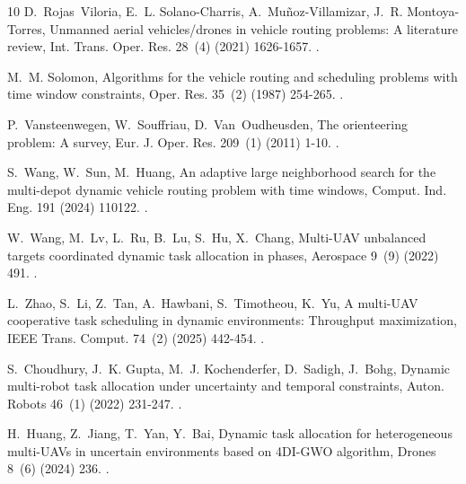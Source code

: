 \documentclass[a4paper,fleqn]{cas-dc}
\begin{document}
\begin{thebibliography}{10}
D.~Rojas~Viloria, E.~L. Solano-Charris, A.~Mu{\~n}oz-Villamizar, J.~R.
  Montoya-Torres, Unmanned aerial vehicles/drones in vehicle routing problems:
  A literature review, Int. Trans. Oper. Res. 28~(4) (2021) 1626-1657.
\newblock \href {https://doi.org/10.1111/itor.12783}
  {}.

M.~M. Solomon, Algorithms for the vehicle routing and scheduling problems with
  time window constraints, Oper. Res. 35~(2) (1987) 254-265.
\newblock \href {https://doi.org/10.1287/opre.35.2.254}
  {}.

P.~Vansteenwegen, W.~Souffriau, D.~Van~Oudheusden, The orienteering problem: A
  survey, Eur. J. Oper. Res. 209~(1) (2011) 1-10.
\newblock \href {https://doi.org/10.1016/j.ejor.2010.03.045}
  {}.

S.~Wang, W.~Sun, M.~Huang, An adaptive large neighborhood search for the
  multi-depot dynamic vehicle routing problem with time windows, Comput. Ind.
  Eng. 191 (2024) 110122.
\newblock \href {https://doi.org/10.1016/j.cie.2024.110122}
  {}.

W.~Wang, M.~Lv, L.~Ru, B.~Lu, S.~Hu, X.~Chang, Multi-{UAV} unbalanced targets
  coordinated dynamic task allocation in phases, Aerospace 9~(9) (2022) 491.
\newblock \href {https://doi.org/10.3390/aerospace9090491}
  {}.

L.~Zhao, S.~Li, Z.~Tan, A.~Hawbani, S.~Timotheou, K.~Yu, A multi-{UAV}
  cooperative task scheduling in dynamic environments: Throughput maximization,
  IEEE Trans. Comput. 74~(2) (2025) 442-454.
\newblock \href {https://doi.org/10.1109/TC.2024.3483636}
  {}.

S.~Choudhury, J.~K. Gupta, M.~J. Kochenderfer, D.~Sadigh, J.~Bohg, Dynamic
  multi-robot task allocation under uncertainty and temporal constraints,
  Auton. Robots 46~(1) (2022) 231-247.
\newblock \href {https://doi.org/10.1007/s10514-021-10022-9}
  {}.

H.~Huang, Z.~Jiang, T.~Yan, Y.~Bai, Dynamic task allocation for heterogeneous
  multi-{UAVs} in uncertain environments based on {4DI-GWO} algorithm, Drones
  8~(6) (2024) 236.
\newblock \href {https://doi.org/10.3390/drones8060236}
  {}.


\end{thebibliography}
\end{document}

